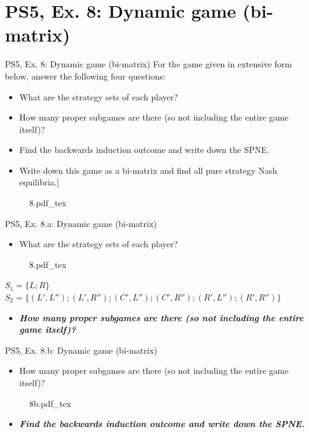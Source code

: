 \section{PS5, Ex. 8: Dynamic game (bi-matrix)}

\begin{frame}{PS5, Ex. 8: Dynamic game (bi-matrix)}
  For the game given in extensive form below, answer the following four questions:
  \begin{itemize}
    \item[(a)] What are the strategy sets of each player?
    \item[(b)] How many proper subgames are there (so not including the entire game itself)?
    \item[(c)] Find the backwards induction outcome and write down the SPNE.
    \item[(d)] Write down this game as a bi-matrix and find all pure strategy Nash equilibria.]
  \end{itemize}
  \begin{figure}[!h]
    \center
    \def\svgwidth{.8\columnwidth}
    {8.pdf_tex}
  \end{figure}
  \vfill\null
\end{frame}

\begin{frame}{PS5, Ex. 8.a: Dynamic game (bi-matrix)}
  \begin{itemize}
    \item[(a)] What are the strategy sets of each player?
  \end{itemize}
  \begin{figure}[!h]
    \center
    \def\svgwidth{.8\columnwidth}
    {8.pdf_tex}
  \end{figure}
  $S_1=\{L;R\}$\\
  $S_2=\{(L',L'');(L', R'');(C',L'');(C', R'');(R',L'');(R', R'')\}$
  \begin{itemize}
    \item[(b)] \textbf{\textit{How many proper subgames are there (so not including the entire game itself)?}}
  \end{itemize}
  \vfill\null
\end{frame}

\begin{frame}{PS5, Ex. 8.b: Dynamic game (bi-matrix)}
  \begin{itemize}
    \item[(b)] How many proper subgames are there (so not including the entire game itself)?
  \end{itemize}
  \begin{figure}[!h]
    \center
    \def\svgwidth{.9\columnwidth}
    {8b.pdf_tex}
  \end{figure}
  \begin{itemize}
    \item[(b)] \textbf{\textit{Find the backwards induction outcome and write down the SPNE.}}
  \end{itemize}
  \vfill\null
\end{frame}

